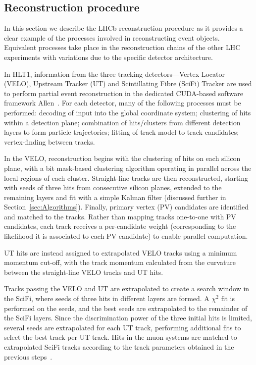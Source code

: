 \subsection{Reconstruction procedure}

In this section we describe the LHCb reconstruction procedure as it provides a clear example of the processes involved in reconstructing event objects. Equivalent processes take place in the reconstruction chains of the other LHC experiments with variations due to the specific detector architecture.

In HLT1, information from the three tracking detectors—Vertex Locator (VELO), Upstream Tracker (UT) and Scintillating Fibre (SciFi) Tracker are used to perform partial event reconstruction in the dedicated CUDA-based software framework Allen~\cite{LHCb_Allen_GPU}. For each detector, many of the following processes must be performed: decoding of input into the global coordinate system; clustering of hits within a detection plane; combination of hits/clusters from different detection layers to form particle trajectories; fitting of track model to track candidates; vertex-finding between tracks.

In the VELO, reconstruction begins with the clustering of hits on each silicon plane, with a bit mask-based clustering algorithm operating in parallel across the local regions of each cluster. Straight-line tracks are then reconstructed, starting with seeds of three hits from consecutive silicon planes, extended to the remaining layers and fit with a simple Kalman filter (discussed further in Section~\ref{sec:Algorithms}). Finally, primary vertex (PV) candidates are identified and matched to the tracks. Rather than mapping tracks one-to-one with PV candidates, each track receives a per-candidate weight (corresponding to the likelihood it is associated to each PV candidate) to enable parallel computation. 

UT hits are instead assigned to extrapolated VELO tracks using a minimum momentum cut-off, with the track momentum calculated from the curvature between the straight-line VELO tracks and UT hits.

Tracks passing the VELO and UT are extrapolated to create a search window in the SciFi, where seeds of three hits in different layers are formed. A $\chi^2$ fit is performed on the seeds, and the best seeds are extrapolated to the remainder of the SciFi layers. Since the discrimination power of the three initial hits is limited, several seeds are extrapolated for each UT track, performing additional fits to select the best track per UT track. Hits in the muon systems are matched to extrapolated SciFi tracks according to the track parameters obtained in the previous steps~\cite{LHCb:2023hlw, LHCb_Allen_GPU}.
